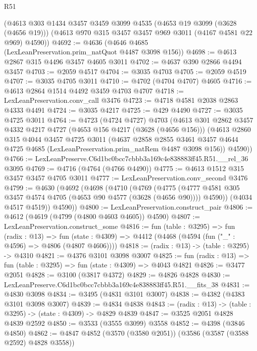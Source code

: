 \begin{lexlean}{R51}
\begin{coremodule}
    (@4613
      @303
      @1434
      @3457
      @3459
      @3099
      @4535
      (@4653 @19 @3099 (@3628 (@4656 @19)))
      (@4613 @970 @315 @3457 @3457 @969 @3011 (@4167 @4581 @22 @969) @4590))
@4692 := @4636 (@4646 @4685 (LexLeanPreservation.prim_natQuot @4487 @3098 @156))
@4698 := @4613 @2867 @315 @4496 @3457 @4605 @3011
@4702 := @4637 @390 @2866 @4494 @3457
@4703 := @2059 @4517
@4704 := @3035 @4703
@4705 := @2059 @4519
@4707 := @3035 @4705 @3011
@4710 := @4702 (@4704 @4707) @4605
@4716 := @4613 @2864 @1514 @4492 @3459 @4703 @4707
@4718 := LexLeanPreservation.conv_call @3476
@4723 := @4718 @4581 @2038 @2863 @4333 @4491
@4724 := @3035 @4217
@4725 := @429 @4490
@4727 := @3035 @4725 @3011
@4764 := @4723
    (@4724 @4727)
    @4703
    (@4613
      @301
      @2862
      @3457
      @4332
      @4217
      @4727
      (@4653 @156 @4217 (@3628 (@4656 @156)))
      (@4613
        @2860
        @315
        @4044
        @3457
        @4725
        @3011
        (@4637
          @2858
          @2855
          @3461
          @3457
          @4644
          @4725
          @4685
          (LexLeanPreservation.prim_natRem @4487 @3098 @156))
        @4590))
@4766 := LexLeanPreserve.C6d1bc0bcc7cbbb3a169c4e838883ff45.R51.__rel_36 @3095
@4769 := @4716 (@4764 (@4766 @4490))
@4775 := @4613 @1512 @315 @3457 @3457 @4705 @3011
@4777 := LexLeanPreservation.conv_second @3476
@4799 := @4630
    (@4692
      (@4698
        (@4710
          (@4769
            (@4775
              (@4777 @4581 @305 @3457 @4574 @4705 (@4653 @90 @4577 (@3628 (@4656 @90))))
              @4590))
          (@4034 @4517 @4519))
        @4590))
@4800 := LexLeanPreservation.construct_pair
@4806 := @4612 (@4619 (@4799 (@4800 @4603 @4605)) @4590)
@4807 := LexLeanPreservation.construct_some
@4816 := fun (table : @3295) =>
  fun (radix : @13) =>
  fun (state : @4309) => @4412 (@4468 (@4594 (fun ("_" : @4596) => @4806 (@4807 @4606))))
@4818 := (radix : @13) -> (table : @3295) -> @4310
@4821 := @4376 @3101 @3098 @3007
@4825 := fun (radix : @13) => fun (table : @3295) => fun (state : @4309) => @4043 @4821
@4826 := @3477 @2051
@4828 := @3100 (@3817 @4372)
@4829 := @4826 @4828
@4830 := LexLeanPreserve.C6d1bc0bcc7cbbb3a169c4e838883ff45.R51.__fits_38
@4831 := @4830 @3098
@4834 := @3495 (@4831 @3101 @3007)
@4838 := @4382 (@4383 @3101 @3098 @3007)
@4839 := @4834 @4838
@4843 := (radix : @13) -> (table : @3295) -> (state : @4309) -> @4829 @4839
@4847 := @3525 @2051 @4828 @4839 @2592
@4850 := @3533 (@3555 @3099) @3558
@4852 := @4398 (@3846 @4850)
@4862 := @4847 @4852 (@3570 (@3580 @2051)) (@3586 (@3587 (@3588 @2592) @4828 @3558))

\end{coremodule}
\end{lexlean}
